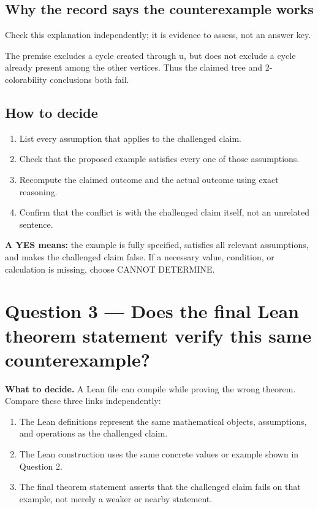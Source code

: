 \documentclass[11pt]{article}
\begin{document}
\subsection*{Why the record says the counterexample works}
Check this explanation independently; it is evidence to assess, not an answer key.
\begin{Vsrc}
The premise excludes a cycle created through u, but does not exclude a cycle already present among the other vertices. Thus the claimed tree and 2-colorability conclusions both fail.
\end{Vsrc}
\subsection*{How to decide}
\begin{enumerate}
\item List every assumption that applies to the challenged claim.
\item Check that the proposed example satisfies every one of those assumptions.
\item Recompute the claimed outcome and the actual outcome using exact reasoning.
\item Confirm that the conflict is with the challenged claim itself, not an unrelated sentence.
\end{enumerate}
\textbf{A YES means:} the example is fully specified, satisfies all relevant assumptions, and makes the challenged claim false. If a necessary value, condition, or calculation is missing, choose CANNOT DETERMINE.
\section*{Question 3 --- Does the final Lean theorem statement verify this same counterexample?}
\textbf{What to decide.} A Lean file can compile while proving the wrong theorem. Compare these three links independently:
\begin{enumerate}
\item The Lean definitions represent the same mathematical objects, assumptions, and operations as the challenged claim.
\item The Lean construction uses the same concrete values or example shown in Question 2.
\item The final theorem statement asserts that the challenged claim fails on that example, not merely a weaker or nearby statement.
\end{enumerate}
\end{document}
